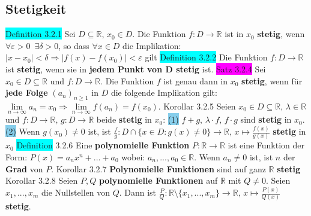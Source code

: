 \documentclass[landscape, 10pt]{article}
\newcommand{\R}{\mathbb{R}}
\begin{document}
\begin{multicols}{3}
\subsection{Stetigkeit}
\colorbox{cyan}{Definition 3.2.1} Sei $D\subseteq\R,\,x_0\in D$. 
                Die Funktion \textcolor{NavyBlue}{$f:D\longrightarrow\R$} 
                ist in $x_0$ \textbf{stetig}, 
                wenn \textcolor{NavyBlue}{$\forall\varepsilon>0\enspace\exists\delta>0$}, 
                so dass 
         \textcolor{NavyBlue}{$\forall x\in D$} die Implikation: 
                \textcolor{NavyBlue}{$|x-x_0|<\delta\Rightarrow|f(x)-f(x_0)|<\varepsilon$} gilt
\colorbox{cyan}{Definition 3.2.2} Die Funktion 
                \textcolor{NavyBlue}{$f:D\longrightarrow\R$}
                ist \textbf{stetig}, wenn sie in \textbf{jedem Punkt von D stetig} ist.
\colorbox{magenta}{Satz 3.2.4} Sei 
                \textcolor{NavyBlue}{$x_0\in D\subseteq\R$} und 
                \textcolor{NavyBlue}{$f:D\longrightarrow\R$}. 
                Die Funktion \textcolor{NavyBlue}{$f$} ist genau 
                dann in \textcolor{NavyBlue}{$x_0$} \textbf{stetig}, wenn für 
                \textbf{jede Folge} 
         \textcolor{NavyBlue}{$(a_n)_{n\geqslant1}$} 
                in $D$ die folgende Implikation gilt: \textcolor{NavyBlue}{
                $\lim\limits_{n\to\infty}a_n=x_0\Longrightarrow
                \lim\limits_{n\to\infty}f(a_n)=f(x_0)$}.
\colorbox{BurntOrange}{Korollar 3.2.5} Seien 
                \textcolor{NavyBlue}{$x_0\in D\subseteq\R,\,\lambda\in\R$} und 
                \textcolor{NavyBlue}{
                $f:D\longrightarrow\R,\,g:D\longrightarrow\R$}
                beide \textbf{stetig} in \textcolor{NavyBlue}{$x_0$}:
                \colorbox{SkyBlue}{(1)} \textcolor{NavyBlue}{
                $f+g,\,\lambda\cdot f,\,f\cdot g$} 
         sind \textbf{stetig} in \textcolor{NavyBlue}{$x_0$}.
                \colorbox{SkyBlue}{(2)} Wenn $g(x_0)\neq0$ ist, ist 
                \textcolor{NavyBlue}{
                $\frac{f}{g}:D\cap\{x\in D:g(x)\neq0\}\longrightarrow\R,\,
                x\longmapsto\frac{f(x)}{g(x)}$} \textbf{stetig} in \textcolor{NavyBlue}{$x_0$}
\colorbox{cyan}{Definition} 3.2.6 Eine \textbf{polynomielle Funktion} 
                \textcolor{NavyBlue}{$P:\R\longrightarrow\R$} ist eine Funktion 
                der Form: \textcolor{NavyBlue}{$P(x)=a_nx^n+...+a_0$}
         wobei: \textcolor{NavyBlue}{$a_n,...,a_0\in\R$}. 
                Wenn \textcolor{NavyBlue}{$a_n\neq0$} ist, ist \textcolor{NavyBlue}{$n$} 
                der \textbf{Grad} von \textcolor{NavyBlue}{$P$}.
\colorbox{BurntOrange}{Korollar 3.2.7} \textbf{Polynomielle Funktionen} sind auf 
                ganz $\R$ \textbf{stetig}
\colorbox{BurntOrange}{Korollar 3.2.8} Seien $P,Q$ \textbf{polynomielle Funktionen} 
                auf $\R$ mit \textcolor{NavyBlue}{$Q\neq0$}. Seien 
                \textcolor{NavyBlue}{$x_1,...,x_m$} die Nullstellen von 
                \textcolor{NavyBlue}{$Q$}. 
         Dann ist \textcolor{NavyBlue}{
                $\frac{P}{Q}:\R\setminus\{x_1,...,x_m\}\longrightarrow\R,\,
                x\longmapsto\frac{P(x)}{Q(x)}$} \textbf{stetig}.

\end{multicols}
\end{document}
